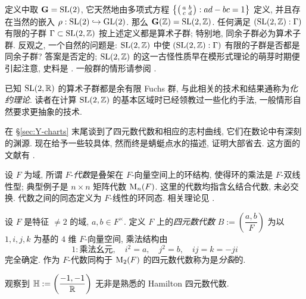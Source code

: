 \begin{example}
	定义中取 $\mathbf{G} = \operatorname{SL}(2)$, 它天然地由多项式方程 $\left\{ \bigl(\begin{smallmatrix} a & b \\ c & d \end{smallmatrix}\bigr) : ad - bc = 1 \right\}$ 定义, 并且存在当然的嵌入 $\rho: \operatorname{SL}(2) \hookrightarrow \operatorname{GL}(2)$. 那么 $\mathbf{G}(\mathbb{Z}) = \operatorname{SL}(2,\mathbb{Z})$. 任何满足 $(\operatorname{SL}(2,\mathbb{Z}) : \Gamma)$ 有限的子群 $\Gamma \subset \operatorname{SL}(2,\mathbb{Z})$ 按上述定义都是算术子群; 特别地, 同余子群必为算术子群. 反观之, 一个自然的问题是: $\operatorname{SL}(2,\mathbb{Z})$ 中使 $(\operatorname{SL}(2,\mathbb{Z}) : \Gamma)$ 有限的子群是否都是同余子群? 答案是否定的; $\operatorname{SL}(2,\mathbb{Z})$ 的这一古怪性质早在模形式理论的萌芽时期便引起注意, 史料是 \cite[II.7.11]{KF1}. 一般群的情形请参阅 \cite{BMS67}.
\end{example}

已知 $\operatorname{SL}(2,\mathbb{R})$ 的算术子群都是余有限 Fuchs 群, 与此相关的技术和结果通称为\emph{化约理论}. 读者在计算 $\operatorname{SL}(2,\mathbb{Z})$ 的基本区域时已经领教过一些化约手法, 一般情形自然要求更抽象的技术.

在 \S\ref{sec:Y-charts} 末尾谈到了四元数代数和相应的志村曲线, 它们在数论中有深刻的渊源. 现在给予一些较具体, 然而终是蜻蜓点水的描述, 证明大部省去. 这方面的文献有 \cite{Vi80, Voi}. 

设 $F$ 为域, 所谓 $F$-\emph{代数}是叠架在 $F$-向量空间上的环结构, 使得环的乘法是 $F$-双线性型; 典型例子是 $n \times n$ 矩阵代数 $\operatorname{M}_n(F)$. 这里的代数均指含幺结合代数, 未必交换. 代数之间的同态定义为 $F$-线性的环同态. 相关理论见 \cite[第七章]{Li1}.

\begin{definition}\label{def:quaternion-alg}
	设 $F$ 是特征 $\neq 2$ 的域, $a, b \in F^\times$. 定义 $F$ 上的\emph{四元数代数} $B := \left( \dfrac{a,b}{F} \right)$ 为以 $1, i, j, k$ 为基的 $4$ 维 $F$-向量空间, 乘法结构由
	\[ 1: \text{乘法幺元}, \quad i^2=a, \quad j^2=b, \quad ij=k=-ji \]
	完全确定. 作为 $F$-代数同构于 $\operatorname{M}_2(F)$ 的四元数代数称为是\emph{分裂}的.
\end{definition}

观察到 $\mathbb{H} := \left( \dfrac{-1, -1}{\mathbb{R}} \right)$ 无非是熟悉的 Hamilton 四元数代数.

